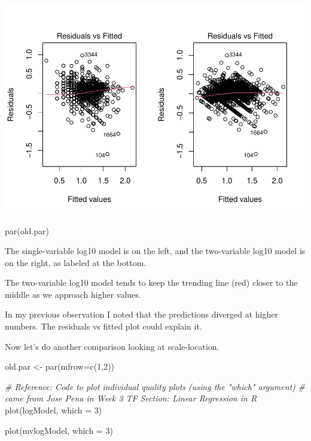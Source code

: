 \documentclass[
]{article}
\newenvironment{Shaded}{\begin{snugshade}}{\end{snugshade}}
\newcommand{\AttributeTok}[1]{\textcolor[rgb]{0.77,0.63,0.00}{#1}}
\newcommand{\CommentTok}[1]{\textcolor[rgb]{0.56,0.35,0.01}{\textit{#1}}}
\newcommand{\DecValTok}[1]{\textcolor[rgb]{0.00,0.00,0.81}{#1}}
\newcommand{\FunctionTok}[1]{\textcolor[rgb]{0.00,0.00,0.00}{#1}}
\newcommand{\NormalTok}[1]{#1}
\newcommand{\OtherTok}[1]{\textcolor[rgb]{0.56,0.35,0.01}{#1}}
\begin{document}
\includegraphics{linear_regression__uc_files/figure-latex/Problem4_Q4.1-1.pdf}

\begin{Shaded}
\begin{Highlighting}[]
\FunctionTok{par}\NormalTok{(old.par)}
\end{Highlighting}
\end{Shaded}

The single-variable log10 model is on the left, and the two-variable
log10 model is on the right, as labeled at the bottom.

The two-variable log10 model tends to keep the trending line (red)
closer to the middle as we approach higher values.

In my previous observation I noted that the predictions diverged at
higher numbers. The residuals vs fitted plot could explain it.

Now let's do another comparison looking at scale-location.

\begin{Shaded}
\begin{Highlighting}[]
\NormalTok{old.par }\OtherTok{\textless{}{-}} \FunctionTok{par}\NormalTok{(}\AttributeTok{mfrow=}\FunctionTok{c}\NormalTok{(}\DecValTok{1}\NormalTok{,}\DecValTok{2}\NormalTok{))}

\CommentTok{\# Reference: Code to plot individual quality plots (using the "which" argument)}
\CommentTok{\# came from Jose Pena in Week 3 TF Section: Linear Regression in R}
\FunctionTok{plot}\NormalTok{(logModel, }\AttributeTok{which =} \DecValTok{3}\NormalTok{)}

\FunctionTok{plot}\NormalTok{(mvlogModel, }\AttributeTok{which =} \DecValTok{3}\NormalTok{)}
\end{Highlighting}
\end{Shaded}
\end{document}
